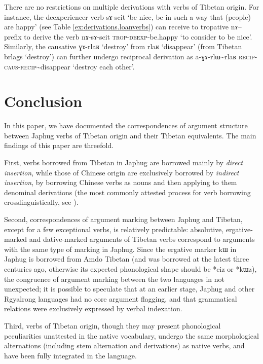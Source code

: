 \documentclass[oldfontcommands,oneside,a4paper,11pt]{article}
\newcommand{\ipa}[1]{{\phon \mbox{#1}}} %
\begin{document}
There are no restrictions on multiple derivations with verbs of Tibetan origin. For instance, the deexperiencer verb \ipa{sɤ-scit} `be nice, be in such a way that (people) are happy' (see Table \ref{ex:derivations.loanverbs}) can receive to tropative \ipa{nɤ--} prefix to derive the verb \ipa{nɤ-sɤ-scit} \textsc{trop-deexp}-be.happy `to consider to be nice'. Similarly, the causative \ipa{ɣɤ-rlaʁ} `destroy' from \ipa{rlaʁ} `disappear' (from Tibetan \ipa{brlags} `destroy') can further undergo reciprocal derivation as  \ipa{a-ɣɤ-rlɯ\textasciitilde{}rlaʁ} \textsc{recip-caus-recip}\textasciitilde{}disappear `destroy each other'.
  
\section{Conclusion}
In this paper, we have documented the correspondences of argument structure between Japhug verbs of Tibetan origin and their Tibetan equivalents. The main findings of this paper are threefold.

First, verbs borrowed from Tibetan in Japhug are borrowed mainly by \textit{direct insertion}, while those of Chinese origin are exclusively borrowed by \textit{indirect insertion}, by borrowing Chinese verbs as nouns and then applying to them denominal derivations (the most commonly attested process for verb borrowing crosslinguistically, see \citealt{wohlgemuth09verbal}). 

Second, correspondences of argument marking between Japhug and Tibetan, except for a few exceptional verbs, is relatively predictable: absolutive, ergative-marked and dative-marked arguments of Tibetan verbs correspond to arguments with the same type of marking in Japhug. Since the ergative marker \ipa{kɯ} in Japhug is borrowed from Amdo Tibetan (and was borrowed at the latest three centuries ago, otherwise its expected phonological shape should be *\ipa{ciz} or *\ipa{kɯz}), the congruence of argument marking between the two languages in not unexpected; it is possible to speculate that at an earlier stage, Japhug and other Rgyalrong languages  had no core argument flagging, and that grammatical relations were exclusively expressed by verbal indexation.

Third, verbs of Tibetan origin, though they may present phonological peculiarities unattested in the native vocabulary, undergo the same morphological alternations (including stem alternation and derivations) as native verbs, and have been fully integrated in the language.





\end{document}
